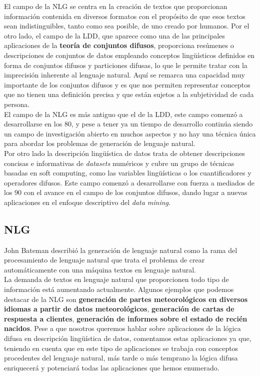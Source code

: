 \documentclass[10pt,a4paper]{article}
\begin{document}
El campo de la NLG se centra en la creación de textos que proporcionan información contenida en diversos formatos con el propósito de que esos textos sean indistinguibles, tanto como sea posible, de uno creado por humanos. Por el otro lado, el campo de la LDD, que aparece como una de las principales aplicaciones de la \textbf{teoría de conjuntos difusos}, proporciona resúmenes o descripciones de conjuntos de datos empleando conceptos lingüísticos definidos en forma de conjuntos difusos y particiones difusas, lo que le permite tratar con la imprecisión inherente al lenguaje natural. Aquí se remarca una capacidad muy importante de los conjuntos difusos y es que nos permiten representar conceptos que no tienen una definición precisa y que están sujetos a la subjetividad de cada persona.\\

El campo de la NLG es más antiguo que el de la LDD, este campo comenzó a desarrollarse en los 80, y pese a tener ya un tiempo de desarrollo continúa siendo un campo de investigación abierto en muchos aspectos y no hay una técnica única para abordar los problemas de generación de lenguaje natural.\\

Por otro lado la descripción lingüística de datos trata de obtener descripciones concisas e informativas de \textit{datasets} numéricos y cubre un grupo de técnicas basadas en soft computing, como las variables lingüísticas o los cuantificadores y operadores difusos. Este campo comenzó a desarrollarse con fuerza a mediados de los 90 con el avance en el campo de los conjuntos difusos, dando lugar a nuevas aplicaciones en el enfoque descriptivo del \textit{data mining}.\\

\subsection{NLG}

John Bateman describió la generación de lenguaje natural como la rama del procesamiento de lenguaje natural que trata el problema de crear automáticamente con una máquina textos en lenguaje natural.\\

La demanda de textos en lenguaje natural que proporcionen todo tipo de información está aumentando actualmente. Algunos ejemplos que podemos destacar de la NLG son \textbf{generación de partes meteorológicos en diversos idiomas a partir de datos meteorológicos}, \textbf{generación de cartas de respuesta a clientes}, \textbf{generación de informes sobre el estado de recién nacidos}. Pese a que nosotros queremos hablar sobre aplicaciones de la lógica difusa en descripción lingüística de datos, comentamos estas aplicaciones ya que, teniendo en cuenta que en este tipo de aplicaciones se trabaja con conceptos procedentes del lenguaje natural, más tarde o más temprano la lógica difusa enriquecerá y potenciará todas las aplicaciones que hemos enumerado.\\
\end{document}
